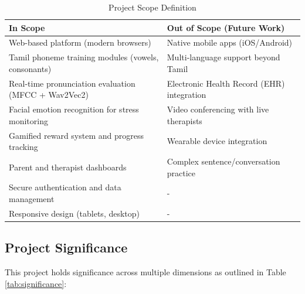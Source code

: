 \documentclass[12pt,a4paper]{article}
\begin{document}
\begin{table}[H]
\centering
\caption{Project Scope Definition}
\label{tab:scope}
\begin{tabular}{p{7cm}p{7cm}}
\toprule
\textbf{In Scope} & \textbf{Out of Scope (Future Work)} \\
\midrule
Web-based platform (modern browsers) & Native mobile apps (iOS/Android) \\
\hline
Tamil phoneme training modules (vowels, consonants) & Multi-language support beyond Tamil \\
\hline
Real-time pronunciation evaluation (MFCC + Wav2Vec2) & Electronic Health Record (EHR) integration \\
\hline
Facial emotion recognition for stress monitoring & Video conferencing with live therapists \\
\hline
Gamified reward system and progress tracking & Wearable device integration \\
\hline
Parent and therapist dashboards & Complex sentence/conversation practice \\
\hline
Secure authentication and data management & - \\
\hline
Responsive design (tablets, desktop) & - \\
\bottomrule
\end{tabular}
\end{table}

\subsection{Project Significance}

This project holds significance across multiple dimensions as outlined in Table \ref{tab:significance}:
\end{document}
